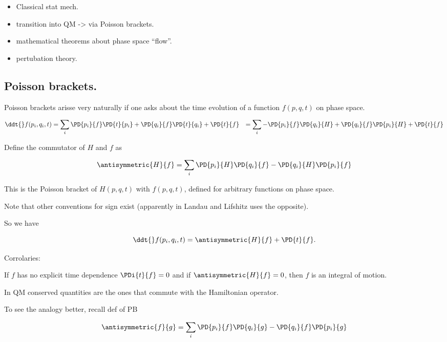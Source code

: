\begin{itemize}
\item Classical stat mech.
\item transition into QM -> via Poisson brackets.
\item mathematical theorems about phase space ``flow''.
\item pertubation theory.
\end{itemize}

\subsection{Poisson brackets.}

Poisson brackets arisse very naturally if one asks about the time evolution of a function $f(p, q, t)$ on phase space.

\begin{align*}
\ddt{} f(p_i, q_i, t)
&=
\sum_i
 \PD{p_i}{f} \PD{t}{p_i}
+ \PD{q_i}{f} \PD{t}{q_i}
+ \PD{t}{f}
&=
\sum_i
- \PD{p_i}{f} \PD{q_i}{H}
+ \PD{q_i}{f} \PD{p_i}{H}
+ \PD{t}{f}
\end{align*}

Define the commutator of $H$ and $f$ as

\begin{equation}\label{eqn:phaseSpaceAndTrajectories:n}
\antisymmetric{H}{f} =
\sum_i
\PD{p_i}{H}
\PD{q_i}{f}
-
\PD{q_i}{H}
\PD{p_i}{f}
\end{equation}

This is the Poisson bracket of $H(p,q,t)$ with $f(p,q,t)$, defined for arbitrary functions on phase space.

Note that other conventions for sign exist (apparently in Landau and Lifshitz uses the opposite).

So we have

\begin{equation}\label{eqn:phaseSpaceAndTrajectories:n}
\ddt{} f(p_i, q_i, t) = \antisymmetric{H}{f} + \PD{t}{f}.
\end{equation}

Corrolaries:

If $f$ has no explicit time dependence $\PDi{t}{f} = 0$ and if $\antisymmetric{H}{f} = 0$, then $f$ is an integral of motion.

In QM conserved quantities are the ones that commute with the Hamiltonian operator.

To see the analogy better, recall def of PB

\begin{equation}\label{eqn:phaseSpaceAndTrajectories:n}
\antisymmetric{f}{g} =
\sum_i
\PD{p_i}{f}
\PD{q_i}{g}
-
\PD{q_i}{f}
\PD{p_i}{g}
\end{equation}

